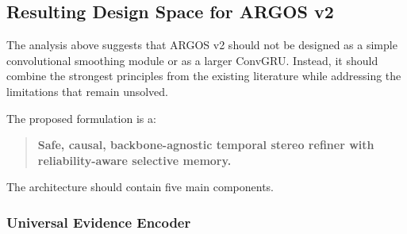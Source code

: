 \documentclass[11pt,a4paper]{article}
\begin{document}
\begin{table}[t]
\centering
\caption{Positioning of ARGOS v2 relative to closely related temporal depth and stereo methods.}
\label{tab:temporal_sota_positioning}
\end{table}

\subsection{Resulting Design Space for ARGOS v2}

The analysis above suggests that ARGOS v2 should not be designed as a simple convolutional smoothing module or as a larger ConvGRU. Instead, it should combine the strongest principles from the existing literature while addressing the limitations that remain unsolved.

The proposed formulation is a:

\begin{quote}
\textbf{Safe, causal, backbone-agnostic temporal stereo refiner with reliability-aware selective memory.}
\end{quote}

The architecture should contain five main components.

\subsubsection{Universal Evidence Encoder}
\end{document}
